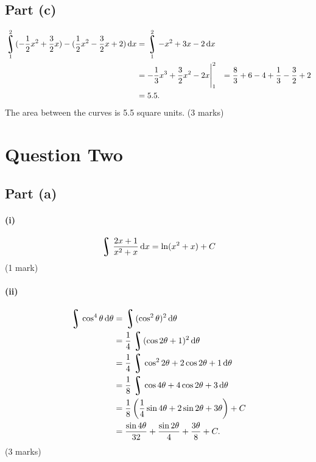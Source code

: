 \documentclass[a4paper]{report}
\DeclareMathOperator*{\rint}{\scalerel*{\rotatebox{17}{$\!\int\!$}}{\int}}
\begin{document}
\subsection*{Part (c)}
\begin{align*}
  \rint^2_1 (-\frac{1}{2}x^2 + \frac{3}{2}x) - (\frac{1}{2}x^2 - \frac{3}{2}x + 2) \dif{x} &= \rint^2_1 -x^2 + 3x - 2 \dif{x}\\
    &= \eval{-\frac{1}{3} x^3 + \frac{3}{2} x^2 - 2x}_1^2
    &= \frac{8}{3} + 6 - 4 + \frac{1}{3} - \frac{3}{2} + 2\\
    &= 5.5.
\end{align*}
The area between the curves is 5.5 square units.
(3 marks)

\section*{Question Two}
\subsection*{Part (a)}
\paragraph{(i)}
\begin{displaymath}
  \rint \frac{2x + 1}{x^2 + x} \dif{x} = \ln(x^2 + x) + C
\end{displaymath}
(1 mark)

\paragraph{(ii)}
\begin{align*}
  \rint \cos^4 \theta \dif{\theta} &= \rint (\cos^2 \theta)^2 \dif{\theta}\\
                                   &= \frac{1}{4} \rint (\cos 2\theta + 1)^2 \dif{\theta}\\
                                   &= \frac{1}{4} \rint \cos^2 2\theta + 2\cos 2\theta + 1 \dif{\theta}\\
                                   &= \frac{1}{8} \rint \cos 4\theta + 4\cos 2\theta + 3 \dif{\theta}\\
                                   &= \frac{1}{8} \left( \frac{1}{4} \sin 4\theta + 2\sin 2\theta + 3\theta \right) + C\\
                                   &= \frac{\sin 4\theta}{32} + \frac{\sin 2\theta}{4} + \frac{3\theta}{8} + C.
\end{align*}
(3 marks)
\end{document}
